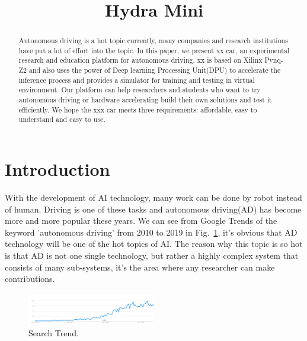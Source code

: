 \documentclass[conference]{IEEEtran}
\begin{document}
\title{Hydra Mini}

\author{
}
\maketitle

\begin{abstract}
Autonomous driving is a hot topic currently, many companies and research institutions have put a lot of effort into the topic. In this paper, we present xx car, an experimental research and education platform for autonomous driving. xx is based on Xilinx Pynq-Z2 and also uses the power of Deep learning Processing Unit(DPU) to accelerate the inference process and provides a simulator for training and testing in virtual environment. Our platform can help researchers and students who want to try autonomous driving or hardware accelerating build their own solutions and test it efficiently. We hope the xxx car meets three requirements: affordable, easy to understand and easy to use. 
\end{abstract}


\section{Introduction}
With the development of AI technology, many work can be done by robot instead of human. Driving is one of these tasks and autonomous driving(AD) has become more and more popular these years. We can see from Google Trends of the keyword 'autonomous driving' from 2010 to 2019 in Fig.~\ref{st}, it's obvious that AD technology will be one of the hot topics of AI. The reason why this topic is so hot is that AD is not one single technology, but rather a highly complex system that consists of many sub-systems\cite{b1}, it's the area where any researcher can make contributions.

\begin{figure}[htbp]
\centerline{\includegraphics[width=0.5\textwidth]{search_result.PNG}}
\caption{Search Trend.}
\label{st}
\end{figure}
\end{document}
